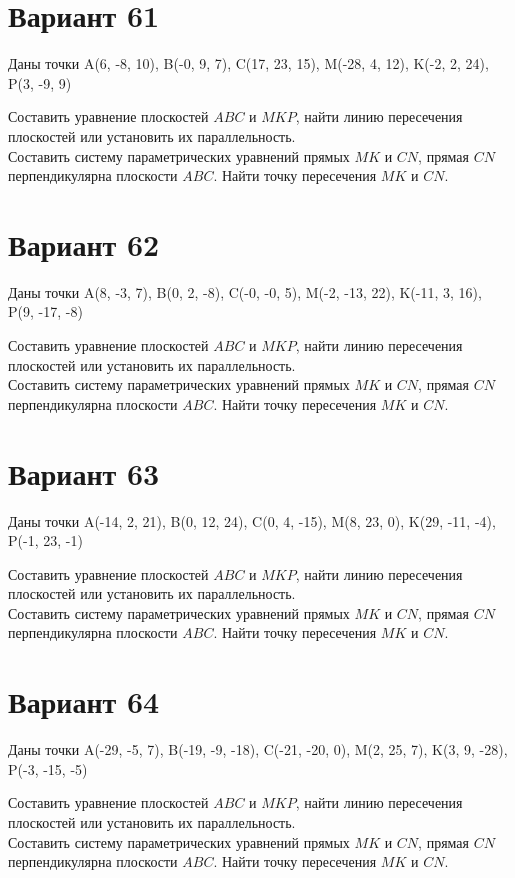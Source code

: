 \documentclass[11pt]{article}
\begin{document}
\section*{Вариант 61}
Даны точки A(6, -8, 10), B(-0, 9, 7), C(17, 23, 15), M(-28, 4, 12), K(-2, 2, 24), P(3, -9, 9)

Составить уравнение плоскостей $ABC$ и $MKP$, найти линию пересечения плоскостей или установить их параллельность.\\
Составить систему параметрических уравнений прямых $MK$ и $CN$, прямая $CN$ перпендикулярна плоскости $ABC$. Найти точку пересечения $MK$ и $CN$.

\section*{Вариант 62}
Даны точки A(8, -3, 7), B(0, 2, -8), C(-0, -0, 5), M(-2, -13, 22), K(-11, 3, 16), P(9, -17, -8)

Составить уравнение плоскостей $ABC$ и $MKP$, найти линию пересечения плоскостей или установить их параллельность.\\
Составить систему параметрических уравнений прямых $MK$ и $CN$, прямая $CN$ перпендикулярна плоскости $ABC$. Найти точку пересечения $MK$ и $CN$.

\section*{Вариант 63}
Даны точки A(-14, 2, 21), B(0, 12, 24), C(0, 4, -15), M(8, 23, 0), K(29, -11, -4), P(-1, 23, -1)

Составить уравнение плоскостей $ABC$ и $MKP$, найти линию пересечения плоскостей или установить их параллельность.\\
Составить систему параметрических уравнений прямых $MK$ и $CN$, прямая $CN$ перпендикулярна плоскости $ABC$. Найти точку пересечения $MK$ и $CN$.

\section*{Вариант 64}
Даны точки A(-29, -5, 7), B(-19, -9, -18), C(-21, -20, 0), M(2, 25, 7), K(3, 9, -28), P(-3, -15, -5)

Составить уравнение плоскостей $ABC$ и $MKP$, найти линию пересечения плоскостей или установить их параллельность.\\
Составить систему параметрических уравнений прямых $MK$ и $CN$, прямая $CN$ перпендикулярна плоскости $ABC$. Найти точку пересечения $MK$ и $CN$.
\end{document}

